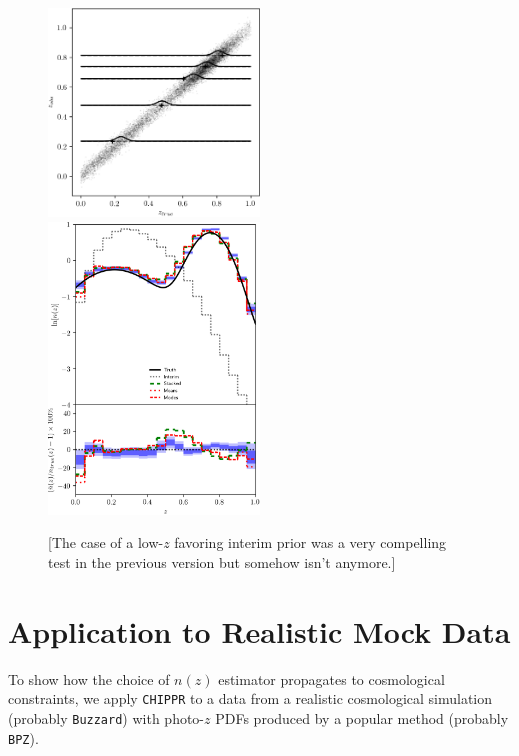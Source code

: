 \documentclass[iop]{emulateapj}
\newcommand{\chippr}{\texttt{CHIPPR} }
\begin{document}
\begin{figure}
	\begin{center}
		\includegraphics[width=0.5\textwidth]{fig/training_prior/scatter.png}\\
		\includegraphics[width=0.5\textwidth]{fig/training_prior/estimators.png}	
		\caption{[The case of a low-$z$ favoring interim prior was a very compelling test in the previous version but somehow isn't anymore.]}
		\label{fig:trainintpr}
	\end{center}
\end{figure}

\section{Application to Realistic Mock Data}
\label{sec:application}

To show how the choice of $n(z)$ estimator propagates to cosmological constraints, we apply \chippr to a data from a realistic cosmological simulation (probably \texttt{Buzzard}) with photo-$z$ PDFs produced by a popular method (probably \texttt{BPZ}).
\end{document}

